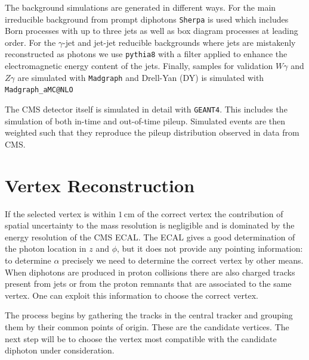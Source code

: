 The background simulations are generated in different ways. For the main irreducible background from prompt diphotons \texttt{Sherpa} is used which includes Born processes with up to three jets as well as box diagram processes at leading order. 
For the $\gamma$-jet and jet-jet reducible backgrounds where jets are mistakenly reconstructed as photons we use \texttt{pythia8} with a filter applied to enhance the electromagnetic energy content of the jets. 
Finally, samples for validation $W\gamma$ and $Z\gamma$ are simulated with \texttt{Madgraph} and Drell-Yan (DY) is simulated with \texttt{Madgraph_{}aMC@NLO}


The CMS detector itself is simulated in detail with \texttt{GEANT4}. 
This includes the simulation of both in-time and out-of-time pileup. 
Simulated events are then weighted such that they reproduce the pileup distribution observed in data from CMS.






\section{Vertex Reconstruction}
If the selected vertex is within $1$\,cm of the correct vertex the contribution of spatial uncertainty to the mass resolution is negligible and is dominated by the energy resolution of the CMS ECAL. 
The ECAL gives a good determination of the photon location in $z$ and $\phi$, but it does not provide any pointing information: to determine $\alpha$ precisely we need to determine the correct vertex by other means.
When diphotons are produced in proton collisions there are also charged tracks present from jets or from the proton remnants that are associated to the same vertex. One can exploit this information to choose the correct vertex.  


The process begins by gathering the tracks in the central tracker and grouping them by their common points of origin. These are the candidate vertices. The next step will be to choose the vertex most compatible with the candidate diphoton under consideration.

